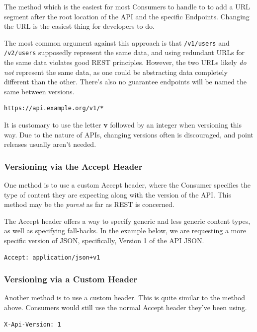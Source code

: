 \documentclass{book}
\begin{document}
The method which is the easiest for most Consumers to handle to to add a URL segment after the root location of the API and the specific Endpoints. Changing the URL is the easiest thing for developers to do.

The most common argument against this approach is that \texttt{/v1/users} and \texttt{/v2/users} supposedly represent the same data, and using redundant URLs for the same data violates good REST principles. However, the two URLs likely \emph{do not} represent the same data, as one could be abstracting data completely different than the other. There's also no guarantee endpoints will be named the same between versions.

\begin{verbatim}
https://api.example.org/v1/*
\end{verbatim}

It is customary to use the letter \textbf{v} followed by an integer when versioning this way. Due to the nature of APIs, changing versions often is discouraged, and point releases usually aren't needed.

\subsubsection{Versioning via the Accept Header}

One method is to use a custom Accept header, where the Consumer specifies the type of content they are expecting along with the version of the API. This method may be the \emph{purest} as far as REST is concerned.

The Accept header offers a way to specify generic and less generic content types, as well as specifying fall-backs. In the example below, we are requesting a more specific version of JSON, specifically, Version 1 of the API JSON.

\begin{verbatim}
Accept: application/json+v1
\end{verbatim}

\subsubsection{Versioning via a Custom Header}

Another method is to use a custom header. This is quite similar to the method above. Consumers would still use the normal Accept header they've been using.

\begin{verbatim}
X-Api-Version: 1
\end{verbatim}
\end{document}
